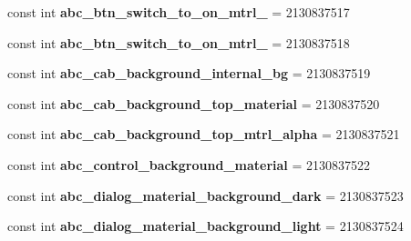 \begin{DoxyCompactItemize}
const int {\bfseries abc\+\_\+btn\+\_\+switch\+\_\+to\+\_\+on\+\_\+mtrl\+\_} = 2130837517
\item 
\mbox{\label{class_pinned_app_1_1_droid_1_1_resource_1_1_drawable_a2751b30736c4a5be70c5c5d7db5c3492}} 
const int {\bfseries abc\+\_\+btn\+\_\+switch\+\_\+to\+\_\+on\+\_\+mtrl\+\_} = 2130837518
\item 
\mbox{\label{class_pinned_app_1_1_droid_1_1_resource_1_1_drawable_a7070bf96bea7845252bc6b51aeb0e379}} 
const int {\bfseries abc\+\_\+cab\+\_\+background\+\_\+internal\+\_\+bg} = 2130837519
\item 
\mbox{\label{class_pinned_app_1_1_droid_1_1_resource_1_1_drawable_a4e428fb48b2992fa8816f297c75c1f26}} 
const int {\bfseries abc\+\_\+cab\+\_\+background\+\_\+top\+\_\+material} = 2130837520
\item 
\mbox{\label{class_pinned_app_1_1_droid_1_1_resource_1_1_drawable_abf068eb2531e10bc5ed25fc30e33827c}} 
const int {\bfseries abc\+\_\+cab\+\_\+background\+\_\+top\+\_\+mtrl\+\_\+alpha} = 2130837521
\item 
\mbox{\label{class_pinned_app_1_1_droid_1_1_resource_1_1_drawable_aeedac2a126268f5f44fd9103d4764a60}} 
const int {\bfseries abc\+\_\+control\+\_\+background\+\_\+material} = 2130837522
\item 
\mbox{\label{class_pinned_app_1_1_droid_1_1_resource_1_1_drawable_a1d1cbf9b2e850a9b7553e77923573981}} 
const int {\bfseries abc\+\_\+dialog\+\_\+material\+\_\+background\+\_\+dark} = 2130837523
\item 
\mbox{\label{class_pinned_app_1_1_droid_1_1_resource_1_1_drawable_a01945ee3f37a1e60b00dacff44d79bc4}} 
const int {\bfseries abc\+\_\+dialog\+\_\+material\+\_\+background\+\_\+light} = 2130837524
\item 
\mbox{\label{class_pinned_app_1_1_droid_1_1_resource_1_1_drawable_a383384fb47dfafe02039ae09980b5cfe}} 

\end{DoxyCompactItemize}
